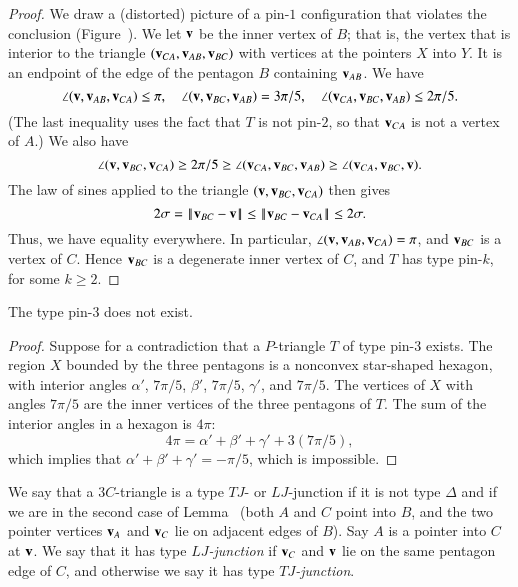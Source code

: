 \begin{proof} 
  We draw a (distorted) picture of a pin-$1$ configuration that
  violates the conclusion (Figure~).  We let ${\mathbf v}$ be the
  inner vertex of $B$; that is, the vertex that is interior to the
  triangle $({\mathbf v}_{CA},{\mathbf v}_{AB},{\mathbf v}_{BC})$ with vertices at the pointers
  $X$ into $Y$.  It is an endpoint of the edge of the pentagon $B$
  containing ${\mathbf v}_{AB}$.  We have
\[
\angle ({\mathbf v},{\mathbf v}_{AB},{\mathbf v}_{CA}) \le \pi,\quad 
\angle({\mathbf v},{\mathbf v}_{BC},{\mathbf v}_{AB}) = 3\pi/5,\quad
\angle({\mathbf v}_{CA},{\mathbf v}_{BC},{\mathbf v}_{AB})\le 2\pi/5.
\]
(The last inequality uses the fact that $T$ is not pin-$2$, so
that ${\mathbf v}_{CA}$ is not a vertex of $A$.)
We also have
\[
\angle({\mathbf v},{\mathbf v}_{BC},{\mathbf v}_{CA}) \ge 2\pi /5 
\ge \angle({\mathbf v}_{CA},{\mathbf v}_{BC},{\mathbf v}_{AB}) \ge \angle({\mathbf v}_{CA},{\mathbf v}_{BC},{\mathbf v}).
\]
The law of sines applied to the triangle $({\mathbf v},{\mathbf v}_{BC},{\mathbf v}_{CA})$ then
gives
\[
2\sigma =\norm{\v_{BC}}{\v}\le\norm{\v_{BC}}{\v_{CA}}\le 2\sigma.
\]
Thus, we have equality everywhere.  In particular,
$\angle({\mathbf v},{\mathbf v}_{AB},{\mathbf v}_{CA})=\pi$, and ${\mathbf v}_{BC}$ is a vertex of $C$.
Hence ${\mathbf v}_{BC}$ is a degenerate inner vertex of $C$, and $T$ has type
pin-$k$, for some $k\ge 2$.
\end{proof}

\begin{lemma}  The type pin-$3$ does not exist.  
\end{lemma}

\begin{proof} 
  Suppose for a contradiction that a $P$-triangle $T$ of type pin-$3$
  exists.  The region $X$ bounded by the three pentagons is a
  nonconvex star-shaped hexagon, with interior angles $\alpha'$,
  $7\pi/5$, $\beta'$, $7\pi/5$, $\gamma'$, and $7\pi/5$.  The vertices
  of $X$ with angles $7\pi/5$ are the inner vertices of the three
  pentagons of $T$.  The sum of the interior angles in a hexagon is
  $4\pi$:
\[
4\pi = \alpha'+\beta'+\gamma' + 3 (7\pi/5),
\]
which implies that $\alpha'+\beta'+\gamma' = -\pi/5$, which is
impossible.
\end{proof}

\begin{definition}
  We say that a $3C$-triangle is a type $TJ$- or $LJ$-junction if it
  is not type $\Delta$ and if we are in the second case of
  Lemma~ (both $A$ and $C$ point into $B$, and the two
  pointer vertices ${\mathbf v}_A$ and ${\mathbf v}_C$ lie on adjacent edges of $B$).
  Say $A$ is a pointer into $C$ at ${\mathbf v}$.  We say that it has type {\it
    $LJ$-junction} if ${\mathbf v}_C$ and ${\mathbf v}$ lie on the same pentagon edge of
  $C$, and otherwise we say it has type {\it $TJ$-junction}.
\end{definition}


